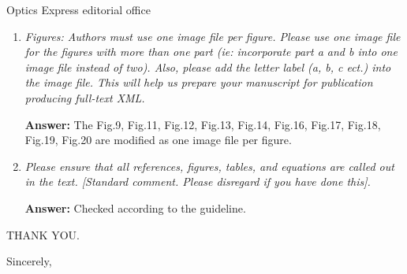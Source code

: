 \documentclass[a4paper,11pt]{letter}
\begin{document}
\begin{letter}{Optics Express editorial office}
\begin{enumerate}
\item \textit{Figures: Authors must use one image file per figure. Please use one image file for the figures with more than one part (ie: incorporate part a and b into one image file instead of two). Also, please add the letter label (a, b, c ect.) into the image file. This will help us prepare your manuscript for publication producing full-text XML.}

\bigskip
\textbf{Answer:}
The Fig.9, Fig.11, Fig.12, Fig.13, Fig.14, Fig.16, Fig.17, Fig.18, Fig.19, Fig.20 are modified as one image file per figure.


\item \textit{Please ensure that all references, figures, tables, and equations are called out in the text. [Standard comment. Please disregard if you have done this].}

\bigskip
\textbf{Answer:} 
Checked according to the guideline. 
\end{enumerate}


THANK YOU.

\vskip 2mm

\closing{Sincerely,}

\end{letter}
\end{document}
